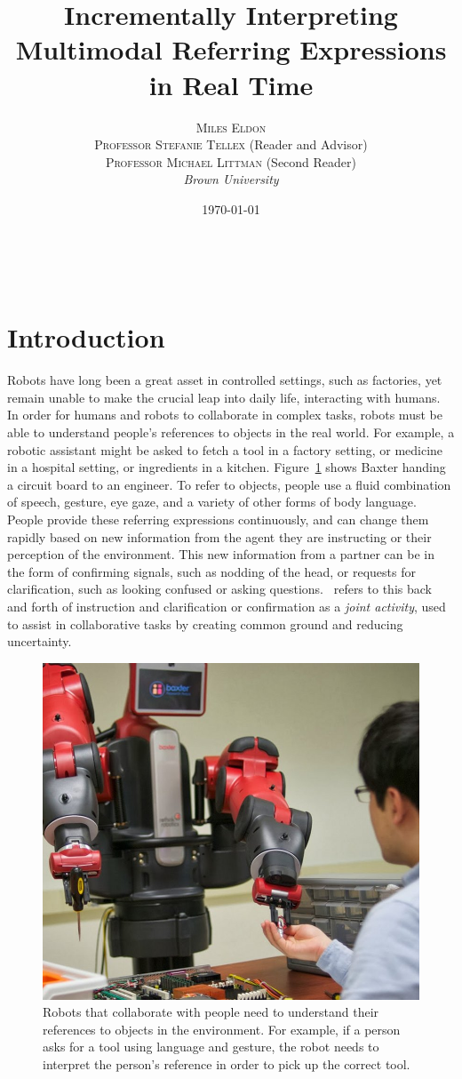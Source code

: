 \documentclass[a4paper, 11pt]{article} %
\title{\textbf{Incrementally Interpreting Multimodal Referring Expressions in Real Time}} %
\author{\textsc{Miles Eldon}\\ %
\textsc{Professor Stefanie Tellex} (Reader and Advisor)\\
{\textsc{Professor Michael Littman} (Second Reader)}
\\{\textit{Brown University}}} %
\date{\today} %
\makeatletter
\renewcommand{\maketitle}{ %
\begin{flushright} %
{\LARGE\@title} %

\vspace{50pt} %

{\large\@author} %
\\\@date %

\vspace{40pt} %
\end{flushright}
}
\makeatother
\begin{document}
\maketitle %
\newpage
\tableofcontents
\newpage
\section{Introduction}
Robots have long been a great asset in controlled settings, such as factories, yet remain unable to make the crucial leap into daily life, interacting with humans. In order for humans and robots to collaborate in complex tasks, robots must be able to understand people's references to objects in the real world. For example, a robotic assistant might be asked to fetch a tool in a factory setting, or medicine in a hospital setting, or ingredients in a kitchen. Figure~\ref{fig:example} shows Baxter handing a circuit board to an engineer. To refer to objects, people use a fluid combination of speech, gesture, eye gaze, and a variety of other forms of body language. People provide these referring expressions continuously, and can change them rapidly based on new information from the agent they are instructing or their perception of the environment. This new information from a partner can be in the form of confirming signals, such as nodding of the head, or requests for clarification, such as looking confused or asking questions.~\citet{clark96} refers to this back and forth of instruction and clarification or confirmation as a \textit{joint activity}, used to assist in collaborative tasks by creating common ground and reducing uncertainty.

\begin{figure}[h]
\centering
\includegraphics[width=0.5\linewidth]{images/baxter_scene_cropped.jpg}
\caption{Robots that collaborate with people need to understand their
  references to objects in the environment.  For example, if a person
  asks for a tool using language and gesture, the robot needs to
  interpret the person's reference in order to pick up the correct
  tool.\label{fig:example}}
\end{figure}
\end{document}

